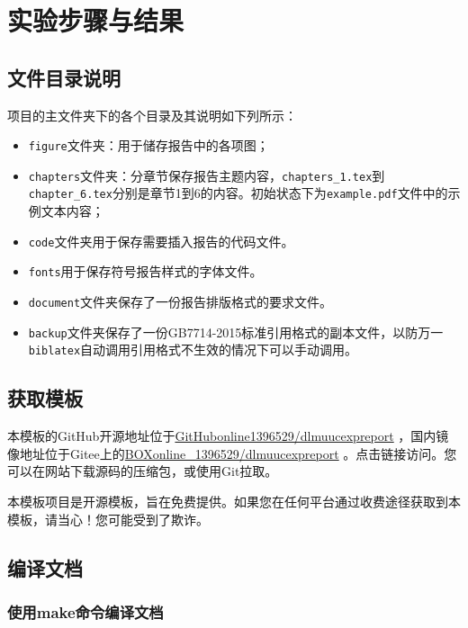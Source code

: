 \chapter{实验步骤与结果}

\section{文件目录说明}

项目的主文件夹下的各个目录及其说明如下列所示：

\begin{itemize}
    \item \texttt{figure}文件夹：用于储存报告中的各项图；
    \item \texttt{chapters}文件夹：分章节保存报告主题内容，\texttt{chapters\_1.tex}到\texttt{chapter\_6.tex}分别是章节1到6的内容。初始状态下为\texttt{example.pdf}文件中的示例文本内容；
    \item \texttt{code}文件夹用于保存需要插入报告的代码文件。
    \item \texttt{fonts}用于保存符号报告样式的字体文件。
    \item \texttt{document}文件夹保存了一份报告排版格式的要求文件。
    \item \texttt{backup}文件夹保存了一份GB7714-2015标准引用格式的副本文件，以防万一\texttt{biblatex}自动调用引用格式不生效的情况下可以手动调用。
\end{itemize}

\section{获取模板}

本模板的GitHub开源地址位于\href{https://github.com/GitHubonline1396529/dlmuucexpreport}{GitHubonline1396529/dlmuucexpreport} ，国内镜像地址位于Gitee上的\href{https://gitee.com/BOXonline_1396529/dlmuucexpreport}{BOXonline\_1396529/dlmuucexpreport} 。点击链接访问。您可以在网站下载源码的压缩包，或使用Git拉取。

本模板项目是开源模板，旨在免费提供。如果您在任何平台通过收费途径获取到本模板，请当心！您可能受到了欺诈。

\section{编译文档}

\subsection{使用make命令编译文档}

